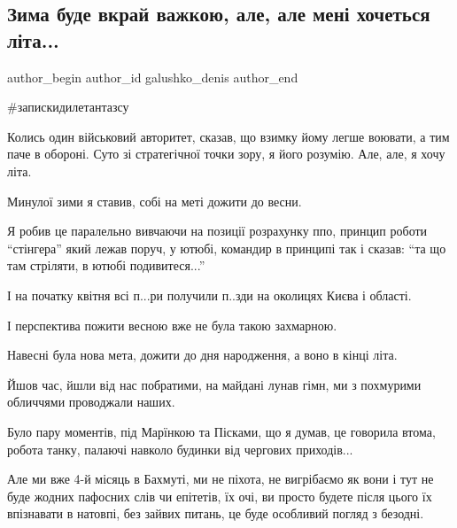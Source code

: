 
 
 
 
 

\subsection{Зима буде вкрай важкою, але, але мені хочеться літа...}
\label{sec:31_12_2022.fb.galushko_denis.1.zima_bude_vkrai_vazh}

\ifcmt
 author_begin
   author_id galushko_denis
 author_end
\fi

\#запискидилетантазсу

Колись один військовий авторитет, сказав, що взимку йому легше воювати, а тим
паче в обороні. Суто зі стратегічної точки зору, я його розумію.  Але, але, я
хочу літа. 

Минулої зими я ставив, собі на меті дожити до весни. 

Я робив це паралельно вивчаючи на позиції розрахунку ппо, принцип роботи
\enquote{стінгера} який лежав поруч, у ютюбі, командир в принципі так і сказав: \enquote{та що
там стріляти, в ютюбі подивитеся...}  

І на початку квітня всі п...ри получили п..зди на околицях Києва і області. 

І перспектива пожити весною вже не була такою захмарною. 

Навесні була нова мета, дожити до дня народження, а воно в кінці літа.

Йшов час, йшли від нас побратими, на майдані лунав гімн, ми з похмурими
обличчями проводжали наших. 

Було пару моментів,  під Марїнкою та Пісками, що я думав, це говорила втома,
робота танку, палаючі навколо будинки від чергових приходів... 

Але ми вже 4-й місяць в Бахмуті, ми не піхота,  не вигрібаємо як вони і тут
не буде жодних пафосних слів чи епітетів, їх очі, ви просто будете після
цього їх впізнавати в натовпі, без зайвих питань, це буде особливий погляд з
безодні. 

